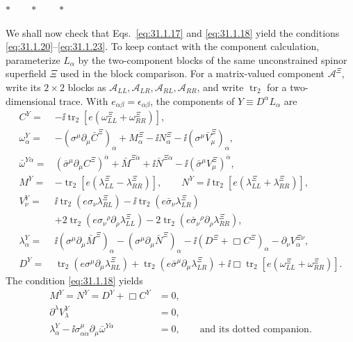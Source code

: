 \begin{center}
\(\ast\qquad\ast\qquad\ast\)
\end{center}

We shall now check that Eqs.~\eqref{eq:31.1.17} and \eqref{eq:31.1.18} yield
the conditions \eqref{eq:31.1.20}--\eqref{eq:31.1.23}.  To keep contact
with the component calculation, parameterize \(L_\alpha\) by the
two-component blocks of the same unconstrained spinor superfield \(\Xi\)
used in the block comparison.  For a matrix-valued component
\(\mathcal A^\Xi\), write its \(2\mathbin{\times}2\) blocks as
\(\mathcal A_{LL},\mathcal A_{LR},\mathcal A_{RL},\mathcal A_{RR}\), and
write \(\operatorname{tr}_2\) for a two-dimensional trace.  With
\(e_{\alpha\beta}=\epsilon_{\alpha\beta}\), the components of
\(Y\equiv D^\alpha L_\alpha\) are
\[
  \begin{aligned}
  C^Y={}&-\ii\operatorname{tr}_2
    \left[e(\omega^\Xi_{LL}+\omega^\Xi_{RR})\right],
  \\
  \omega^Y_\alpha={}&
    -(\sigma^\mu\partial_\mu\bar C^\Xi)_\alpha
    +M^\Xi_\alpha-\ii N^\Xi_\alpha
    -\ii(\sigma^\mu\bar V_\mu^\Xi)_\alpha,
  \\
  \bar\omega^{Y\dot\alpha}={}&
    (\bar\sigma^\mu\partial_\mu C^\Xi)^{\dot\alpha}
    +\bar M^{\Xi\dot\alpha}+\ii\bar N^{\Xi\dot\alpha}
    -\ii(\bar\sigma^\mu V_\mu^\Xi)^{\dot\alpha},
  \\
  M^Y={}&-\operatorname{tr}_2
    [e(\lambda^\Xi_{LL}-\lambda^\Xi_{RR})],
  \qquad
  N^Y=\ii\operatorname{tr}_2
    [e(\lambda^\Xi_{LL}+\lambda^\Xi_{RR})],
  \\
  V_\nu^Y={}&
    \ii\operatorname{tr}_2(e\sigma_\nu\lambda^\Xi_{RL})
    -\ii\operatorname{tr}_2(e\bar\sigma_\nu\lambda^\Xi_{LR})\\
  &+2\operatorname{tr}_2
    (e\sigma_{\nu}{}^\rho\partial_\rho\lambda^\Xi_{LL})
    -2\operatorname{tr}_2
    (e\bar\sigma_{\nu}{}^\rho\partial_\rho\lambda^\Xi_{RR}),
  \\
  \lambda^Y_\alpha={}&
    \ii(\sigma^\mu\partial_\mu\bar M^\Xi)_\alpha
    -(\sigma^\mu\partial_\mu\bar N^\Xi)_\alpha
    -\ii(D^\Xi+\Box C^\Xi)_\alpha
    -\partial_\nu V^{\Xi\nu}_\alpha,
  \\
  D^Y={}&
    \operatorname{tr}_2(e\sigma^\mu\partial_\mu\lambda^\Xi_{RL})
    +\operatorname{tr}_2(e\bar\sigma^\mu
      \partial_\mu\lambda^\Xi_{LR})
    +\ii\Box\operatorname{tr}_2
      [e(\omega^\Xi_{LL}+\omega^\Xi_{RR})].
  \end{aligned}
\]
The condition \eqref{eq:31.1.18} yields
\[
  \begin{aligned}
  M^Y=N^Y=D^Y+\Box C^Y&=0,\\
  \partial^\lambda V_\lambda^Y&=0,\\
  \lambda^Y_\alpha-\ii\sigma^\mu_{\alpha\dot\alpha}
    \partial_\mu\bar\omega^{Y\dot\alpha}&=0,
  \qquad\text{and its dotted companion}.
  \end{aligned}
\]

